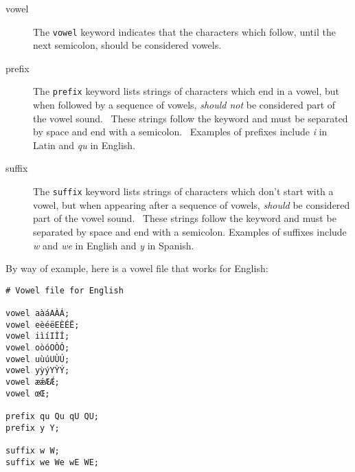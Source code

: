 \begin{description}

\item[vowel]

The \texttt{vowel} keyword indicates that the characters which follow,
until the next semicolon, should be considered vowels.

\item[prefix]

The \texttt{prefix} keyword lists strings of characters which end in a
vowel, but when followed by a sequence of vowels, \emph{should not} be
considered part of the vowel sound.  These strings follow the keyword
and must be separated by space and end with a semicolon.  Examples of
prefixes include \emph{i} in Latin and \emph{qu} in English.

\item[suffix]

The \texttt{suffix} keyword lists strings of characters which don't
start with a vowel, but when appearing after a sequence of vowels,
\emph{should} be considered part of the vowel sound.  These strings
follow the keyword and must be separated by space and end with a
semicolon.  Examples of suffixes include \emph{w} and \emph{we} in
English and \emph{y} in Spanish.

\end{description}

By way of example, here is a vowel file that works for English:

\begin{lstlisting}
# Vowel file for English

vowel aàáAÀÁ;
vowel eèéëEÈÉË;
vowel iìíIÌÍ;
vowel oòóOÒÓ;
vowel uùúUÙÚ;
vowel yỳýYỲÝ;
vowel æǽÆǼ;
vowel œŒ;

prefix qu Qu qU QU;
prefix y Y;

suffix w W;
suffix we We wE WE;
\end{lstlisting}
